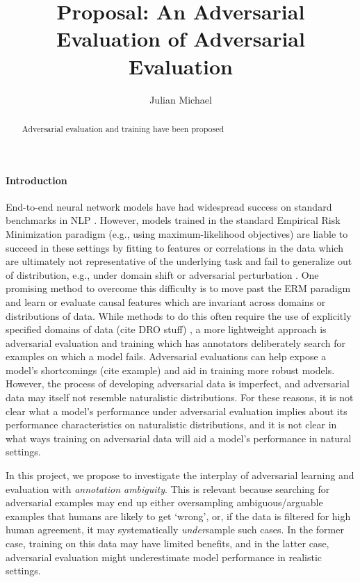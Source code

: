 \documentclass[10pt,a4paper]{article}
\title{Proposal: An Adversarial Evaluation of Adversarial Evaluation}
\author{Julian Michael}
\affil[ ]{CSE 599: Empirical Foundations of Machine Learning}
\affil[ ]{Paul G. Allen School of Computer Science \& Engineering, University of Washington}
\affil[ ]{\texttt{julianjm@cs.washington.edu}}
\date{}
\newcommand{\eg}{e.g.}
\begin{document}
\maketitle

\begin{abstract}
  Adversarial evaluation and training have been proposed
\end{abstract}

\paragraph{Introduction}
End-to-end neural network models have had widespread success on standard benchmarks in NLP
\citep{wang-etal-2019-glue,wang-etal-2019-superglue,lee-etal-2018-end,dozat-manning-2017-deep}.
However, models trained in the standard Empirical Risk Minimization paradigm (\eg, using
maximum-likelihood objectives) are liable to succeed in these settings by fitting to features or
correlations in the data which are ultimately not representative of the underlying task and fail to
generalize out of distribution, \eg, under domain shift or adversarial perturbation
\citep{gururangan-etal-2018-annotation,ilyas-etal-2019-adversarial}.
One promising method to overcome this difficulty is to move past the ERM paradigm and learn or
evaluate causal features which are invariant across domains or distributions of data.
While methods to do this often require the use of explicitly specified domains of data (cite DRO
stuff) \citep{peters-etal-2016-causal,arjovsky-etal-2020-invariant},
a more lightweight approach is adversarial evaluation and training
\citep{nie-etal-2020-adversarial,kiela-etal-2021-dynabench} which has annotators deliberately search
for examples on which a model fails.
Adversarial evaluations can help expose a model's shortcomings (cite example) and aid in training
more robust models.
However, the process of developing adversarial data is imperfect, and adversarial data may itself
not resemble naturalistic distributions.
For these reasons, it is not clear what a model's performance under adversarial evaluation implies
about its performance characteristics on naturalistic distributions,
and it is not clear in what ways training on adversarial data will aid a model's performance in
natural settings.

In this project, we propose to investigate the interplay of adversarial learning and evaluation with
\textit{annotation ambiguity}.
This is relevant because searching for adversarial examples may end up either oversampling
ambiguous/arguable examples that humans are likely to get `wrong', or, if the data is filtered for
high human agreement, it may systematically \textit{under}sample such cases.
In the former case, training on this data may have limited benefits, and in the latter case,
adversarial evaluation might underestimate model performance in realistic settings.
\end{document}
